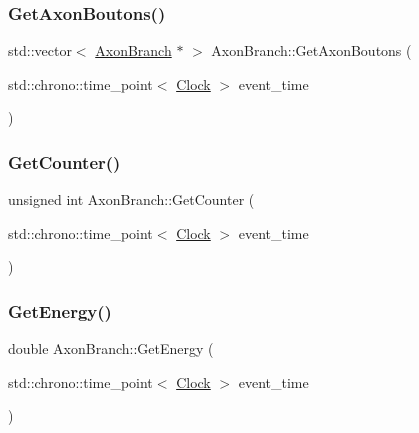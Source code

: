 \mbox{\label{classAxonBranch_aafadba57924686a8087c7f7758889045}} 
\subsubsection{\texorpdfstring{Get\+Axon\+Boutons()}{GetAxonBoutons()}}
{\footnotesize\ttfamily std\+::vector$<$ \mbox{\hyperlink{classAxonBranch}{Axon\+Branch}} $\ast$ $>$ Axon\+Branch\+::\+Get\+Axon\+Boutons (\begin{DoxyParamCaption}\item[{std\+::chrono\+::time\+\_\+point$<$ \mbox{\hyperlink{universe_8h_a0ef8d951d1ca5ab3cfaf7ab4c7a6fd80}{Clock}} $>$}]{event\+\_\+time }\end{DoxyParamCaption})}

\mbox{\label{classAxonBranch_a1d2404b68ec2d18a814c96a7c04c5fc4}} 
\subsubsection{\texorpdfstring{Get\+Counter()}{GetCounter()}}
{\footnotesize\ttfamily unsigned int Axon\+Branch\+::\+Get\+Counter (\begin{DoxyParamCaption}\item[{std\+::chrono\+::time\+\_\+point$<$ \mbox{\hyperlink{universe_8h_a0ef8d951d1ca5ab3cfaf7ab4c7a6fd80}{Clock}} $>$}]{event\+\_\+time }\end{DoxyParamCaption})\hspace{0.3cm}{\ttfamily [inline]}}

\mbox{\label{classAxonBranch_a688ec51cd5116e9aebe9b4d3c5c7f2b1}} 
\subsubsection{\texorpdfstring{Get\+Energy()}{GetEnergy()}}
{\footnotesize\ttfamily double Axon\+Branch\+::\+Get\+Energy (\begin{DoxyParamCaption}\item[{std\+::chrono\+::time\+\_\+point$<$ \mbox{\hyperlink{universe_8h_a0ef8d951d1ca5ab3cfaf7ab4c7a6fd80}{Clock}} $>$}]{event\+\_\+time }\end{DoxyParamCaption})\hspace{0.3cm}{\ttfamily [inline]}}


